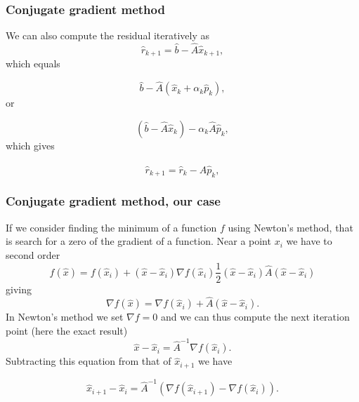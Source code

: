 \documentclass{beamer}
\begin{document}
\begin{frame}
\frametitle{Conjugate gradient method}

\begin{block}{}
We can also  compute the residual iteratively as
\begin{equation*}
\hat{r}_{k+1}=\hat{b}-\hat{A}\hat{x}_{k+1},
 \end{equation*}
which equals

\begin{equation*}
\hat{b}-\hat{A}(\hat{x}_k+\alpha_k\hat{p}_k),
 \end{equation*}
or

\begin{equation*}
(\hat{b}-\hat{A}\hat{x}_k)-\alpha_k\hat{A}\hat{p}_k,
 \end{equation*}
which gives

\begin{equation*}
\hat{r}_{k+1}=\hat{r}_k-\hat{A}\hat{p}_{k},
 \end{equation*}
\end{block}
\end{frame}

\begin{frame}
\frametitle{Conjugate gradient method, our case}

\begin{block}{}
If we consider finding the minimum of a function $f$ using Newton's method,
that is search for a zero of the gradient of a function.  Near a point $x_i$
we have to second order
\begin{equation*}
f(\hat{x})=f(\hat{x}_i)+(\hat{x}-\hat{x}_i)\nabla f(\hat{x}_i)
\frac{1}{2}(\hat{x}-\hat{x}_i)\hat{A}(\hat{x}-\hat{x}_i)
\end{equation*}
giving
\begin{equation*}
\nabla f(\hat{x})=\nabla f(\hat{x}_i)+\hat{A}(\hat{x}-\hat{x}_i).
 \end{equation*}
In Newton's method we set $\nabla f = 0$ and we can thus compute the next iteration point
(here the exact result)
\begin{equation*}
\hat{x}-\hat{x}_i=\hat{A}^{-1}\nabla f(\hat{x}_i).
\end{equation*}
Subtracting this equation from that of $\hat{x}_{i+1}$ we have

\begin{equation*}
\hat{x}_{i+1}-\hat{x}_i=\hat{A}^{-1}(\nabla f(\hat{x}_{i+1})-\nabla f(\hat{x}_i)).
\end{equation*}
\end{block}
\end{frame}
\end{document}
